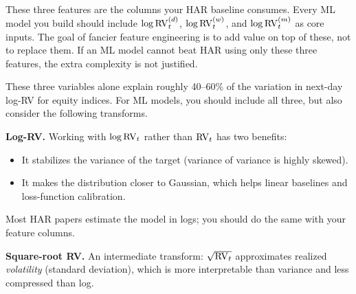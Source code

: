 \begin{projectconnection}
These three features are the columns your HAR baseline consumes. Every ML model you build should include $\log \operatorname{RV}_t^{(d)}$, $\log \operatorname{RV}_t^{(w)}$, and $\log \operatorname{RV}_t^{(m)}$ as core inputs. The goal of fancier feature engineering is to add value on top of these, not to replace them. If an ML model cannot beat HAR using only these three features, the extra complexity is not justified.
\end{projectconnection}

These three variables alone explain roughly 40--60\% of the variation in next-day log-RV for equity indices.
For ML models, you should include all three, but also consider the following transforms.

\textbf{Log-RV.} Working with $\log \operatorname{RV}_t$ rather than $\operatorname{RV}_t$ has two benefits:
\begin{itemize}[nosep]
  \item It stabilizes the variance of the target (variance of variance is highly skewed).
  \item It makes the distribution closer to Gaussian, which helps linear baselines and loss-function calibration.
\end{itemize}
Most HAR papers estimate the model in logs; you should do the same with your feature columns.

\textbf{Square-root RV.} An intermediate transform: $\sqrt{\operatorname{RV}_t}$ approximates realized \emph{volatility} (standard deviation), which is more interpretable than variance and less compressed than log.


